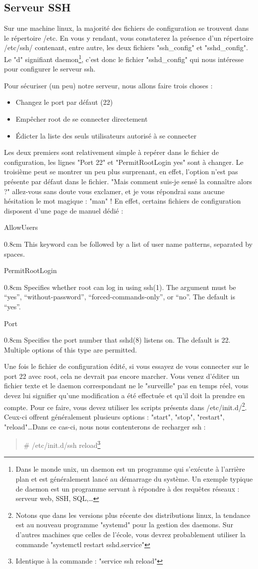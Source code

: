 \documentclass[a4paper,11pt]{article}
\newcommand{\commande}[1] {
    \begin{quote}
    \tt\raggedright #1 
    \end{quote}
}
\newcommand{\man}[2]{
    \begin{tcolorbox}[toprule=3mm,width=\textwidth,outer arc=0mm,colbacktitle=grayman,coltitle=black,colback={grayman},colframe={grayman},title={man : \tt #1}]
        \tt\raggedright #2
    \end{tcolorbox}
}
\newcommand{\mandesc}[1]{
    \begin{adjustwidth}{0.8cm}{}
        #1
    \end{adjustwidth}
}
\begin{document}
\subsection{Serveur SSH}
\par Sur une machine linux, la majorité des fichiers de configuration se trouvent dans le répertoire /etc. En vous y rendant, vous constaterez la présence d'un répertoire /etc/ssh/ contenant, entre autre, les deux fichiers "ssh\_config" et "sshd\_config". Le "d" signifiant daemon\footnote{Dans le monde unix, un daemon est un programme qui s'exécute à l'arrière plan et est généralement lancé au démarrage du système. Un exemple typique de daemon est un programme servant à répondre à des requêtes réseaux : serveur web, SSH, SQL,\dots }, c'est donc le fichier "sshd\_config" qui nous intéresse pour configurer le serveur ssh.
\par Pour sécuriser (un peu) notre serveur, nous allons faire trois choses :
\begin{itemize}
    \item Changez le port par défaut (22)
    \item Empêcher root de se connecter directement
    \item Édicter la liste des seuls utilisateurs autorisé à se connecter
\end{itemize}
\par Les deux premiers sont relativement simple à repérer dans le fichier de configuration, les lignes "Port 22" et "PermitRootLogin yes" sont à changer. Le troisième peut se montrer un peu plus surprenant, en effet, l'option n'est pas présente par défaut dans le fichier. "Mais comment suis-je sensé la connaître alors ?" allez-vous sans doute vous exclamer, et je vous répondrai sans aucune hésitation le mot magique : "man" ! En effet, certains fichiers de configuration disposent d'une page de manuel dédié :
\man{sshd\_config}{
AllowUsers
\mandesc{This keyword can be followed by a list of user name patterns, separated by spaces.}
PermitRootLogin
\mandesc{Specifies whether root can log in using ssh(1).  The argument must be “yes”, “without-password”, “forced-commands-only”, or “no”. The default is “yes”.}
Port
\mandesc{Specifies the port number that sshd(8) listens on.  The default is 22.  Multiple options of this type are permitted.}
}
\par Une fois le fichier de configuration édité, si vous essayez de vous connecter sur le port 22 avec root, cela ne devrait pas encore marcher. Vous venez d'éditer un fichier texte et le daemon correspondant ne le "surveille" pas en temps réel, vous devez lui signifier qu'une modification a été effectuée et qu'il doit la prendre en compte. Pour ce faire, vous devez utiliser les scripts présents dans /etc/init.d/\footnote{Notons que dans les versions plus récente des distributions linux, la tendance est au nouveau programme "systemd" pour la gestion des daemons. Sur d'autres machines que celles de l'école, vous devrez probablement utiliser la commande "systemctl restart sshd.service"}. Ceux-ci offrent généralement plusieurs options : "start", "stop", "restart", "reload"\ldots Dans ce cas-ci, nous nous contenterons de recharger ssh :
\commande{\# /etc/init.d/ssh reload\footnote{Identique à la commande : "service ssh reload"}}
\end{document}
